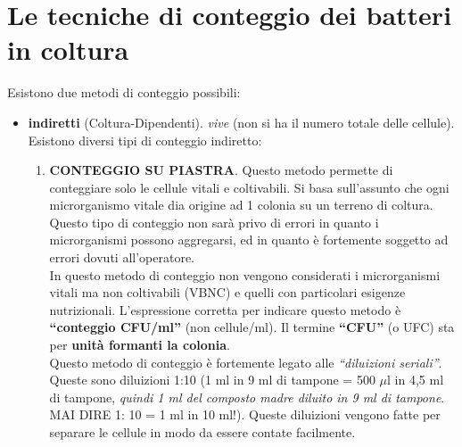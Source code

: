 \documentclass[11pt]{book}
\begin{document}
\section{Le tecniche di conteggio dei batteri in coltura}

Esistono due metodi di conteggio possibili:
\begin{itemize} 
\item \textbf{indiretti} (Coltura-Dipendenti).  \emph{vive} (non si ha il numero totale delle cellule). Esistono diversi tipi di conteggio indiretto:
\begin{enumerate}
\item \textbf{CONTEGGIO SU PIASTRA}. Questo metodo permette di conteggiare solo le cellule vitali e coltivabili. Si basa sull’assunto che ogni microrganismo vitale dia origine ad 1 colonia su un terreno di coltura.
Questo tipo di conteggio non sarà privo di errori in quanto i microrganismi possono aggregarsi, ed in quanto è fortemente soggetto ad errori dovuti all’operatore.\\ 
In questo metodo di conteggio non vengono considerati i microrganismi vitali ma non coltivabili (VBNC) e quelli con particolari esigenze nutrizionali.
L'espressione corretta per indicare questo metodo è \textbf{``conteggio CFU/ml''} (non cellule/ml). Il termine \textbf{``CFU''} (o UFC) sta per \textbf{unità formanti la colonia}.\\
Questo metodo di conteggio è fortemente legato alle \emph{``diluizioni seriali''}. Queste sono diluizioni 1:10 (1 ml in 9 ml di tampone = 500 $\mu$l in 4,5 ml di tampone, \emph{quindi 1 ml del composto madre diluito in 9 ml di tampone}. MAI DIRE  1: 10 = 1 ml in 10 ml!).
Queste diluizioni vengono fatte per separare le cellule in modo da essere contate facilmente.


\end{enumerate}
\end{itemize}
\end{document}
